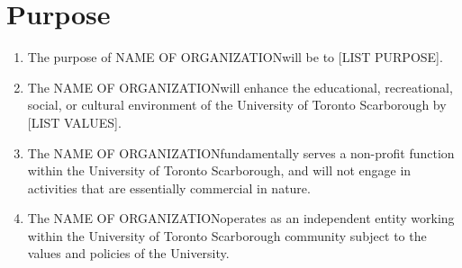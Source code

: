 \documentclass[12pt]{article}
\newcommand{\orgname}{NAME OF ORGANIZATION\space}
\begin{document}
\section{Purpose}
\begin{enumerate}[{2}.1]
    \item	The purpose of \orgname will be to [LIST PURPOSE].
    \item	The \orgname will enhance the educational, recreational, social, or cultural environment of the University of Toronto Scarborough by [LIST VALUES].
    \item	The \orgname fundamentally serves a non-profit function within the University of Toronto Scarborough, and will not engage in activities that are essentially commercial in nature. 
    \item	The \orgname operates as an independent entity working within the University of Toronto Scarborough community subject to the values and policies of the University.  
\end{enumerate}


\end{document}
